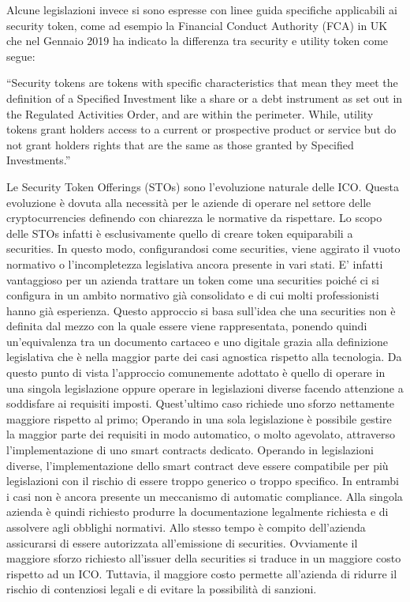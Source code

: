 Alcune legislazioni invece si sono espresse con linee guida specifiche applicabili ai security token, come ad esempio la Financial Conduct Authority (FCA) in UK che nel Gennaio 2019 ha indicato la differenza tra security e utility token come segue:

“Security tokens are tokens with specific characteristics that mean they meet the definition of a Specified Investment like a share or a debt instrument as set out in the Regulated Activities Order, and are within the perimeter.
While, utility tokens grant holders access to a current or prospective product or service but do not grant holders rights that are the same as those granted by Specified Investments.”

 

Le Security Token Offerings (STOs) sono l'evoluzione naturale delle ICO. Questa evoluzione è dovuta alla necessità per le aziende di operare nel settore delle cryptocurrencies definendo con chiarezza le normative da rispettare. Lo scopo delle STOs infatti è esclusivamente quello di creare token equiparabili a securities. In questo modo, configurandosi come securities, viene aggirato il vuoto normativo o l'incompletezza legislativa ancora presente in vari stati. E' infatti vantaggioso per un azienda trattare un token come una securities poiché ci si configura in un ambito normativo già consolidato e di cui molti professionisti hanno già esperienza. Questo approccio si basa sull'idea che una securities non è definita dal mezzo con la quale essere viene rappresentata, ponendo quindi un'equivalenza tra un documento cartaceo e uno digitale grazia alla definizione legislativa che è nella maggior parte dei casi agnostica rispetto alla tecnologia.  Da questo punto di vista l'approccio comunemente adottato è quello di operare in una singola legislazione oppure operare in legislazioni diverse facendo attenzione a soddisfare ai requisiti imposti. Quest'ultimo caso richiede uno sforzo nettamente maggiore rispetto al primo; Operando in una sola legislazione è possibile gestire la maggior parte dei requisiti in modo automatico, o molto agevolato, attraverso l'implementazione di uno smart contracts dedicato. Operando in legislazioni diverse, l'implementazione dello smart contract deve essere compatibile per più legislazioni con il rischio di essere troppo generico o troppo specifico. In entrambi i casi non è ancora presente un meccanismo di automatic compliance. Alla singola azienda è quindi richiesto produrre la documentazione legalmente richiesta e di assolvere agli obblighi normativi. Allo stesso tempo è compito dell'azienda assicurarsi di essere autorizzata all'emissione di securities. Ovviamente il maggiore sforzo richiesto all'issuer della securities si traduce in un maggiore costo rispetto ad un ICO. Tuttavia, il maggiore costo permette all'azienda di ridurre il rischio di contenziosi legali e di evitare la possibilità di sanzioni. 
